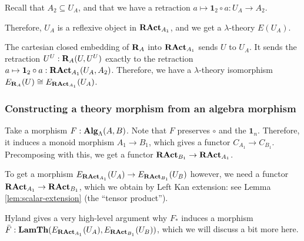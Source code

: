 \begin{definition}
  Recall that $ A_2 \subseteq U_A $, and that we have a retraction $ a \mapsto \mathbf 1_2 \circ a : U_A \to A_2 $.

  Therefore, $ U_A $ is a reflexive object in $ \mathbf{RAct}_{A_1} $, and we get a $ \lambda $-theory $ E(U_A) $.
\end{definition}

\begin{remark}
  The cartesian closed embedding of $ \mathbf{R}_A $ into $ \mathbf{RAct}_{A_1} $ sends $ U $ to $ U_A $. It sends the retraction $ U^U: \mathbf{R}_A(U, U^U) $ exactly to the retraction $ a \mapsto \mathbf 1_2 \circ a: \mathbf{RAct}_{A_1}(U_A, A_2) $. Therefore, we have a $ \lambda $-theory isomorphism $ E_{\mathbf{R}_A}(U) \cong E_{\mathbf{RAct}_{A_1}}(U_A) $.
\end{remark}

\subsubsection{Constructing a theory morphism from an algebra morphism}

Take a morphism $ F: \mathbf{Alg}_{\Lambda}(A, B) $. Note that $ F $ preserves $ \circ $ and the $ \mathbf 1_n $. Therefore, it induces a monoid morphism $ A_1 \to B_1 $, which gives a functor $ C_{A_1} \to C_{B_1} $. Precomposing with this, we get a functor $ \mathbf{RAct}_{B_1} \to \mathbf{RAct}_{A_1} $.

To get a morphism $ E_{\mathbf{RAct}_{A_1}}(U_A) \to E_{\mathbf{RAct}_{B_1}}(U_B) $ however, we need a functor $ \mathbf{RAct}_{A_1} \to \mathbf{RAct}_{B_1} $, which we obtain by Left Kan extension: see Lemma \ref{lem:scalar-extension} (the ``tensor product'').

Hyland gives a very high-level argument why $ F_* $ induces a morphism $ \bar F : \mathbf{LamTh}(E_{\mathbf{RAct}_{A_1}}(U_A), E_{\mathbf{RAct}_{B_1}}(U_B)) $, which we will discuss a bit more here.


